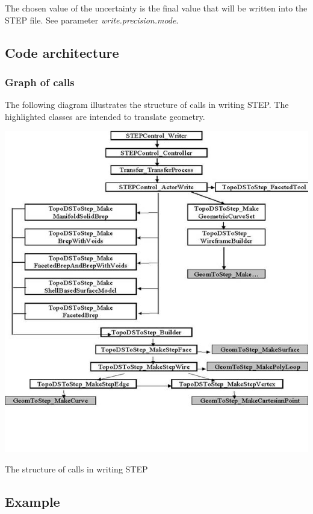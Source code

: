 The chosen value of the uncertainty is the final value that will be written into the S\+T\+EP file. See parameter {\itshape write.\+precision.\+mode}.\hypertarget{occt_user_guides__step_occt_step_3_6}{}\subsection{Code architecture}\label{occt_user_guides__step_occt_step_3_6}
\hypertarget{occt_user_guides__step_occt_step_3_6_1}{}\subsubsection{Graph of calls}\label{occt_user_guides__step_occt_step_3_6_1}
The following diagram illustrates the structure of calls in writing S\+T\+EP. The highlighted classes are intended to translate geometry.


\begin{DoxyImage}
\begin{center}
 \includegraphics[width=\textwidth,height=\textheight/2,keepaspectratio=true]{step_image004.png}
\end{center}
\caption{The structure of calls in writing S\+T\+EP}
\end{DoxyImage}
\hypertarget{occt_user_guides__step_occt_step_3_7}{}\subsection{Example}\label{occt_user_guides__step_occt_step_3_7}

